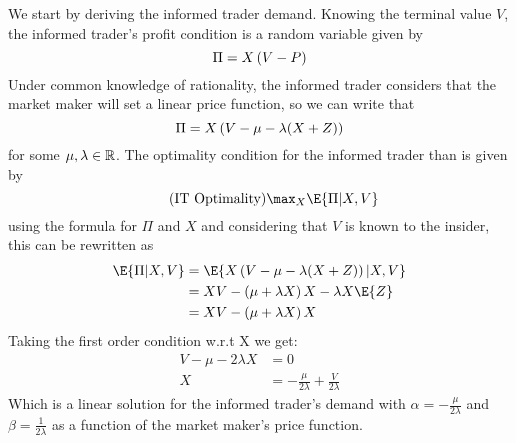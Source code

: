 \begin{solution}
    We start by deriving the informed trader demand. Knowing the terminal value \(V\), the informed trader's profit condition is a random variable given by 
    \[
        \Pi = X\left( V - P \right)
    \]
    Under common knowledge of rationality, the informed trader considers that the market maker will set a linear price function, so we can write that
    \[
        \Pi = X\left( V - \mu - \lambda (X + Z) \right)
    \]
    for some \(\mu, \lambda \in \mathbb{R}\). The optimality condition for the informed trader than is given by
    \begin{equation}
        \label{eq:it_optimality}
        \tag{IT Optimality}
        \max_X \E{\Pi \vert X, V} 
    \end{equation}
    using the formula for \(\Pi\) and \(X\) and considering that \(V\) is known to the insider, this can be rewritten as
    \begin{align*}
        \E{\Pi \vert X, V} & = \E{X\bp{V - \mu - \lambda (X + Z)} \vert X, V} \\
        & = XV - \bp{\mu + \lambda X}X - \lambda X \E{Z} \\
        & = XV - \bp{\mu + \lambda X}X
    \end{align*}
    Taking the first order condition w.r.t X we get:
    \begin{align*}
        \label{eq:it_foc}
        \tag{FOC}
        V-\mu - 2\lambda X & = 0 \\
        X & = -\frac{\mu}{2\lambda} + \frac{V}{2\lambda}
    \end{align*}
    Which is a linear solution for the informed trader's demand with \(\alpha = -\frac{\mu}{2\lambda}\) and \(\beta = \frac{1}{2\lambda}\) as a function of the market maker's price function.


\end{solution}
